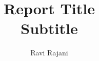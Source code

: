 \documentclass[style=report]{tablet}
\title{Report Title\\[1ex]\LARGE\normalfont Subtitle}%
\author{Ravi Rajani}
\begin{document}
\def\subbib{}
\maketitle
\tableofcontents
%
\end{document}
